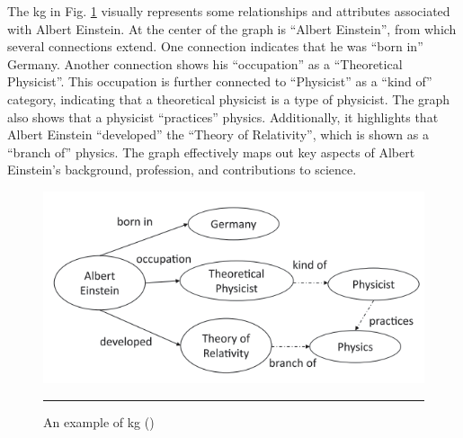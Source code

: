 The \gls{kg} in Fig. \ref{fig:kg-example-albert-einstein} visually represents some relationships and attributes associated with Albert Einstein.
At the center of the graph is ``Albert Einstein'', from which several connections extend.
One connection indicates that he was ``born in'' Germany.
Another connection shows his ``occupation'' as a ``Theoretical Physicist''.
This occupation is further connected to ``Physicist'' as a ``kind of'' category, indicating that a theoretical physicist is a type of physicist.
The graph also shows that a physicist ``practices'' physics.
Additionally, it highlights that Albert Einstein ``developed'' the ``Theory of Relativity'', which is shown as a ``branch of'' physics.
The graph effectively maps out key aspects of Albert Einstein's background, profession, and contributions to science.

\begin{figure}[htbp]
    \centering
 \includegraphics[width=.7\textwidth]{03_Figures/literature-review/kg-example-albert-einstein.png}
     \rule{35em}{0.5pt}
    \caption{An example of \acrlong{kg} (\cite{Chaudhri2022})} 
 \label{fig:kg-example-albert-einstein}
\end{figure}


